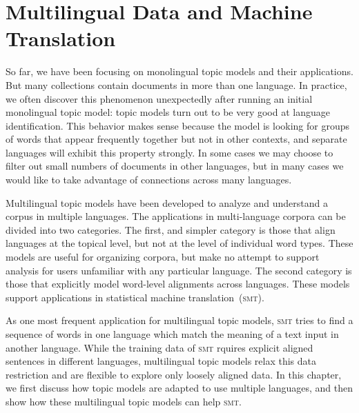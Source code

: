 \chapter{Multilingual Data and Machine Translation}
\label{ch:mt}

So far, we have been focusing on monolingual topic models and their applications.
But many collections contain documents in more than one language.
In practice, we often discover this phenomenon unexpectedly after running an initial monolingual topic model: topic models turn out to be very good at language identification.
This behavior makes sense because the model is looking for groups of words that appear frequently together but not in other contexts, and separate languages will exhibit this property strongly.
In some cases we may choose to filter out small numbers of documents in other languages, but in many cases we would like to take advantage of  connections across many languages.

Multilingual topic models have been developed to analyze and understand a corpus in multiple languages.
The applications in multi-language corpora can be divided into two categories.
The first, and simpler category is those that align languages at the topical level, but not at the level of individual word types.
These models are useful for organizing corpora, but make no attempt to support analysis for users unfamiliar with any particular language.
The second category is those that explicitly model word-level alignments across languages.
These models support applications in statistical machine translation~(\textsc{smt}).

As one most frequent application for multilingual topic models, \textsc{smt} tries
to find a sequence of words in one language  which match the meaning of a text input
in another language. While the training data of \textsc{smt} rquires explicit aligned sentences
in different languages, multilingual topic models relax this data restriction and are flexible to 
explore only loosely aligned data.  In this chapter, we first discuss how topic models are 
adapted to use multiple languages, and then show how these multilingual topic models can 
help \textsc{smt}.

